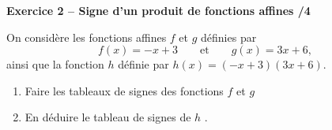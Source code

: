 \documentclass[10pt,a4paper]{article}
\begin{document}
\begin{sujets}
\textbf{Exercice 2 -- Signe d'un produit de fonctions affines \hfill /4}

On considère les fonctions affines \(f\) et \(g\) définies par
\[
f(x)=-x+3 \qquad\text{et}\qquad g(x)=3x+6,
\]
ainsi que la fonction \(h\) définie par \(h(x)=(-x+3)(3x+6)\).


\begin{enumerate}
\item Faire les tableaux de signes des fonctions \(f\) et \(g\)

\vspace{4cm}

\item En déduire le tableau de signes de \(h\) .

\vspace{4cm}

\end{enumerate}

\text{ }
\end{sujets}
\end{document}
